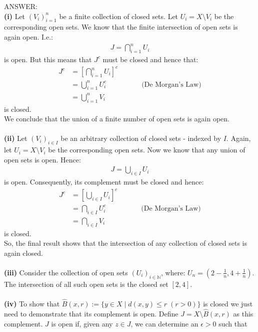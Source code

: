 \documentclass[12pt]{article}
\begin{document}
\vspace{1cm}
\noindent
ANSWER:\\
\textbf{(i)} Let $(V_i)_{i=1}^n$ be a finite collection of closed sets.  Let $U_i = X \setminus V_i$ be the corresponding
open sets.  We know that the finite intersection of open sets is again open.  I.e.:
\begin{align*}
J=\bigcap_{i=1}^n U_i
\end{align*}
is open.  But this means that $J^c$ must be closed and hence that:
\begin{align*}
J^c &= \left[\bigcap_{i=1}^n U_i\right]^c \\
&= \bigcup_{i=1}^n U_i^c \;\;\;\;\;\;\;\;\;\;\;\;\;\;\;\;\;\; \text{(De Morgan's Law)} \\
&= \bigcup_{i=1}^n V_i
\end{align*}
is closed.\\
We conclude that the union of a finite number of open sets is again open.\\
\\
\textbf{(ii)} Let $(V_i)_{i \in I}$ be an arbitrary collection of closed sets - indexed by $I$.  Again, let $U_i = X \setminus V_i$ be the corresponding
open sets.  Now we know that any union of open sets is open.  Hence:
\begin{align*}
J=\bigcup_{i \in I} U_i
\end{align*}
is open.  Consequently, its complement must be closed and hence:
\begin{align*}
J^c &= \left[\bigcup_{i \in I} U_i\right]^c \\
&= \bigcap_{i \in I} U_i^c \;\;\;\;\;\;\;\;\;\;\;\;\;\;\;\;\;\; \text{(De Morgan's Law)} \\
&= \bigcap_{i \in I} V_i
\end{align*}
is closed.\\
So, the final result shows that the intersection of any collection of closed sets is again closed.\\
\\
\textbf{(iii)} Consider the collection of open sets $(U_i)_{i \in \mathbb{N}}$, where: $U_n = (2 - \frac{1}{n}, 4 + \frac{1}{n})$.
The intersection of all such open sets is the closed set $[2, 4]$.\\
\\
\textbf{(iv)} To show that $\hat{B}(x, r) := \{y \in X \; | \; d(x, y) \le r \; (r>0) \}$ is closed we just need to demonstrate that its complement is open.
Define $J=X \setminus \hat{B}(x, r)$ as this complement.  $J$ is open if, given any $z \in J$, we can determine an $\epsilon > 0$ such that 
\end{document}
